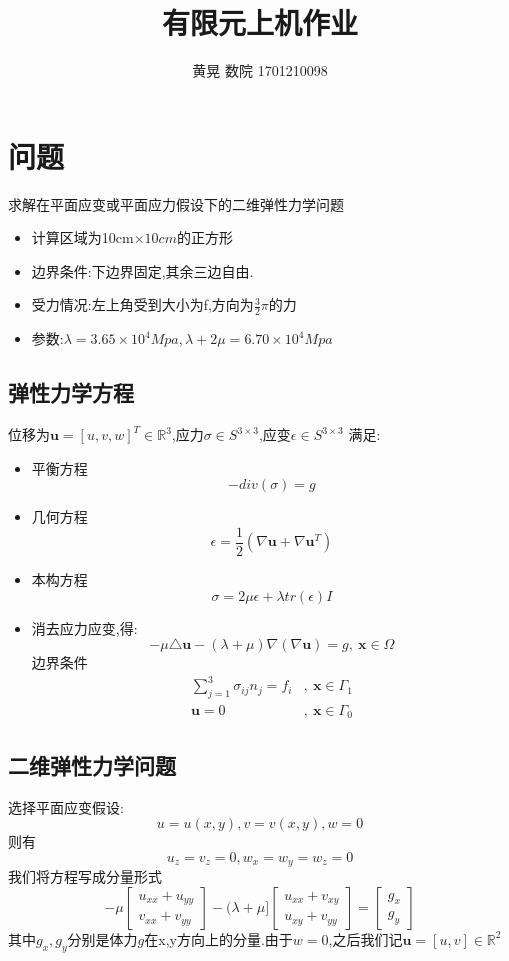 \documentclass[UTF8]{ctexart}
\author{黄晃 数院 1701210098 }
\title{有限元上机作业}
\begin{document}
  \maketitle
\section{问题}
求解在平面应变或平面应力假设下的二维弹性力学问题
\begin{itemize}
  \item 计算区域为10cm$\times10cm$的正方形
  \item 边界条件:下边界固定,其余三边自由.
  \item 受力情况:左上角受到大小为f,方向为$\frac{3}{2}\pi$的力
  \item 参数:$\lambda=3.65\times 10^4Mpa,\lambda+2\mu = 6.70\times 10^4Mpa$
\end{itemize}
\subsection{弹性力学方程}
位移为$\mathbf{u}=[u,v,w]^T \in\mathbb{R}^3$,应力$\sigma \in S^{3\times 3}$,应变$\epsilon\in S^{3\times3}$
满足:
\begin{itemize}
  \item 平衡方程
  $$
  -div(\sigma)=g
  $$
  \item 几何方程
  $$
  \epsilon = \frac{1}{2}(\nabla \mathbf{u} + \nabla \mathbf{u}^T)
  $$
  \item 本构方程
  $$
  \sigma = 2\mu \epsilon + \lambda tr(\epsilon)I
  $$
  \item 消去应力应变,得:
  $$
  -\mu \triangle \mathbf{u} - (\lambda+\mu)\nabla(\nabla\mathbf{u})=g,\ \mathbf{x}\in \Omega
  $$
  边界条件
  \begin{align*}
  \sum_{j=1}^{3}\sigma_{ij}n_j = f_i & ,\ \mathbf{x}\in \Gamma_1 \\
    \mathbf{u}=0 & ,\ \mathbf{x}\in \Gamma_0
  \end{align*}
\end{itemize}
\subsection{二维弹性力学问题}
选择平面应变假设:
$$
u = u(x,y),v=v(x,y),w=0
$$
则有
$$
u_z = v_z=0,w_x=w_y=w_z=0
$$
我们将方程写成分量形式
\begin{equation}\label{p0}
  -\mu\left[
  \begin{matrix}
    u_{xx} + u_{yy} \\
     v_{xx} + v_{yy}
  \end{matrix}
  \right]
-(\lambda+\mu]\left[
  \begin{matrix}
    u_{xx} + v_{xy} \\
     u_{xy} + v_{yy}
  \end{matrix}
  \right]
=
  \left[
  \begin{matrix}
    g_x \\
     g_y
  \end{matrix}
  \right]
  \end{equation}
其中$g_x,g_y$分别是体力$g$在x,y方向上的分量.由于$w=0$,之后我们记$\mathbf{u}=[u,v]\in \mathbb{R}^2$
\end{document}
